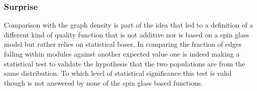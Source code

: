
\subsubsection{Surprise}\label{sec:surprise}

Comparison with the graph density is part of the idea that led to a definition of a different kind of quality function that is not additive nor is based on a spin glass model but rather relies on statistical bases. In comparing the fraction of edges falling within modules against another expected value one is indeed making a statistical test to validate the hypothesis that the two populations are from the same distribution. To which level of statistical significance this test is valid though is not answered by none of the spin glass based functions.


